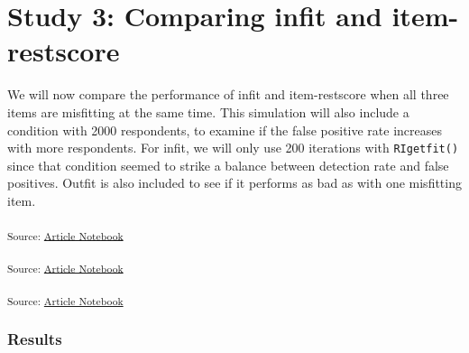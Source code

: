 \documentclass[
  letterpaper,
  DIV=11,
  numbers=noendperiod]{scrartcl}
\begin{document}
\section{Study 3: Comparing infit and
item-restscore}\label{study-3-comparing-infit-and-item-restscore}

We will now compare the performance of infit and item-restscore when all
three items are misfitting at the same time. This simulation will also
include a condition with 2000 respondents, to examine if the false
positive rate increases with more respondents. For infit, we will only
use 200 iterations with \texttt{RIgetfit()} since that condition seemed
to strike a balance between detection rate and false positives. Outfit
is also included to see if it performs as bad as with one misfitting
item.

\textsubscript{Source:
\href{https://pgmj.github.io/rasch_itemfit/index.qmd.html}{Article
Notebook}}

\textsubscript{Source:
\href{https://pgmj.github.io/rasch_itemfit/index.qmd.html}{Article
Notebook}}

\textsubscript{Source:
\href{https://pgmj.github.io/rasch_itemfit/index.qmd.html}{Article
Notebook}}

\subsubsection{Results}\label{results-2}
\end{document}
